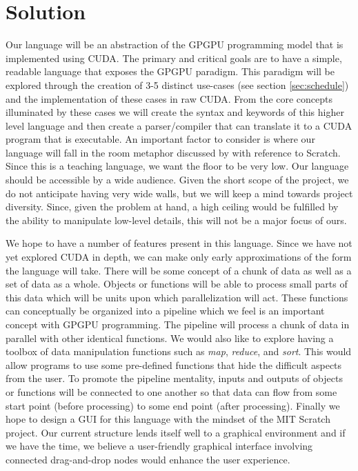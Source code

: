 \documentclass{article}
\begin{document}
\section{Solution}
Our language will be an abstraction of the GPGPU programming model that is implemented using CUDA. The primary and critical goals are to have a simple, readable language that exposes the GPGPU paradigm. This paradigm will be explored through the creation of 3-5 distinct use-cases (see section \ref{sec:schedule}) and the implementation of these cases in raw CUDA. From the core concepts illuminated by these cases we will create the syntax and keywords of this higher level language and then create a parser/compiler that can translate it to a CUDA program that is executable. An important factor to consider is where our language will fall in the room metaphor discussed by  with reference to Scratch. Since this is a teaching language, we want the floor to be very low. Our language should be accessible by a wide audience. Given the short scope of the project, we do not anticipate having very wide walls, but we will keep a mind towards project diversity. Since, given the problem at hand, a high ceiling would be fulfilled by the ability to manipulate low-level details, this will not be a major focus of ours.

We hope to have a number of features present in this language. Since we have not yet explored CUDA in depth, we can make only early approximations of the form the language will take. There will be some concept of a chunk of data as well as a set of data as a whole. Objects or functions will be able to process small parts of this data which will be units upon which parallelization will act. These functions can conceptually be organized into a pipeline which we feel is an important concept with GPGPU programming. The pipeline will process a chunk of data in parallel with other identical functions. We would also like to explore having a toolbox of data manipulation functions such as {\em map}, {\em reduce}, and {\em sort}. This would allow programs to use some pre-defined functions that hide the difficult aspects from the user. To promote the pipeline mentality, inputs and outputs of objects or functions will be connected to one another so that data can flow from some start point (before processing) to some end point (after processing). Finally we hope to design a GUI for this language with the mindset of the MIT Scratch project. Our current structure lends itself well to a graphical environment and if we have the time, we believe a user-friendly graphical interface involving connected drag-and-drop nodes would enhance the user experience.
\end{document}
